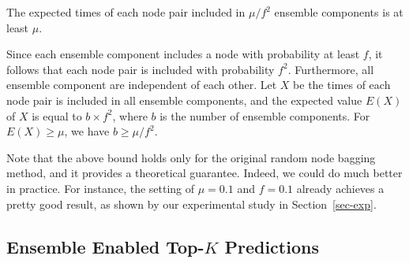 \begin{prop}
The expected times of each node pair included in $\mu / f^{2}$ ensemble
components is at least $\mu$.
\end{prop}

\begin{IEEEproof}
Since each ensemble component includes a node with probability at
least $f$, it follows that each node pair is included with
probability $f^2$. Furthermore, all ensemble component are independent
of each other. Let $X$ be the times of each node pair is included in
all ensemble components, and the expected value $E(X)$ of $X$ is equal
to $b \times f^2$, where $b$ is the number of ensemble components. For
$E(X) \geq \mu$, we have $b \geq \mu / f^2 $.
\end{IEEEproof}


Note that the above bound holds only for the original random node bagging method, and it provides a theoretical guarantee.
Indeed, we could do much better in practice. For instance, the setting of $\mu = 0.1$ and $f = 0.1$ already achieves a pretty good result, as shown by our experimental study in Section~\ref{sec-exp}.

\subsection{Ensemble Enabled Top-$K$ Predictions}


